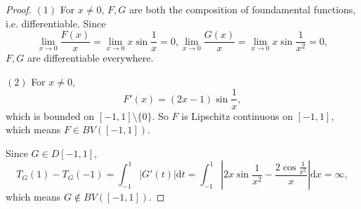 \documentclass{article}
\newcommand{\dif}{\mathrm{d}}
\begin{document}
\begin{proof}
    $(1)$ For $x\neq 0$, $F,G$ are both the composition of foundamental functions, i.e. differentiable. 
    Since 
    \begin{displaymath}
        \lim_{x\rightarrow 0}\frac{F(x)}{x}=\lim_{x\rightarrow 0}x\sin\frac{1}{x}=0,
        \lim_{x\rightarrow 0}\frac{G(x)}{x}=\lim_{x\rightarrow 0}x\sin\frac{1}{x^2}=0,
    \end{displaymath}
    $F,G$ are differentiable everywhere.

    $(2)$ For $x\neq 0$, 
    \begin{displaymath}
        F'(x)=(2x-1)\sin\frac{1}{x},
    \end{displaymath}
    which is bounded on $[-1,1]\setminus\{0\}$. So $F$ is Lipschitz continuous on $[-1,1]$, which means 
    $F\in BV([-1,1])$.

    Since $G\in D[-1,1]$, 
    \begin{displaymath}
        T_{G}(1)-T_{G}(-1)=\int_{-1}^{1}|G'(t)|\dif t
        =\int_{-1}^{1}\left|2x\sin\frac{1}{x^2}-\frac{2\cos\frac{1}{x^2}}{x}\right|\dif x=\infty,
    \end{displaymath}
    which means $G\notin BV([-1,1])$.
\end{proof}
\end{document}
